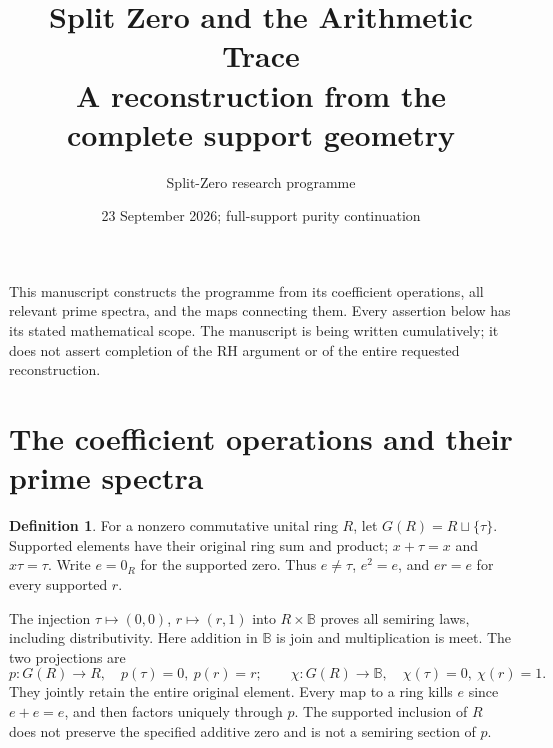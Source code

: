 \documentclass[11pt,a4paper]{article}
\title{Split Zero and the Arithmetic Trace\\A reconstruction from the complete support geometry}
\author{Split-Zero research programme}
\date{23 September 2026; full-support purity continuation}
\theoremstyle{definition}\newtheorem{definition}[theorem]{Definition}
\newcommand{\B}{\mathbb B}\newcommand{\N}{\mathbb N}
\begin{document}
\maketitle
This manuscript constructs the programme from its coefficient operations, all relevant prime spectra, and the maps connecting them. Every assertion below has its stated mathematical scope. The manuscript is being written cumulatively; it does not assert completion of the RH argument or of the entire requested reconstruction.
\tableofcontents
\section{The coefficient operations and their prime spectra}
\label{sec:rebuilt-spectra}
\begin{definition}
For a nonzero commutative unital ring $R$, let $G(R)=R\sqcup\{\tau\}$. Supported elements have their original ring sum and product; $x+\tau=x$ and $x\tau=\tau$. Write $e=0_R$ for the supported zero. Thus $e\ne\tau$, $e^2=e$, and $er=e$ for every supported $r$.
\end{definition}
The injection $\tau\mapsto(0,0)$, $r\mapsto(r,1)$ into $R\times\B$ proves all semiring laws, including distributivity. Here addition in $\B$ is join and multiplication is meet. The two projections are
\begin{equation}\label{eq:base-two-maps}
 p:G(R)\to R,\quad p(\tau)=0,\ p(r)=r;
 \qquad \chi:G(R)\to\B,\quad\chi(\tau)=0,\ \chi(r)=1.
\end{equation}
They jointly retain the entire original element. Every map to a ring kills $e$ since $e+e=e$, and then factors uniquely through $p$. The supported inclusion of $R$ does not preserve the specified additive zero and is not a semiring section of $p$.
\end{document}
